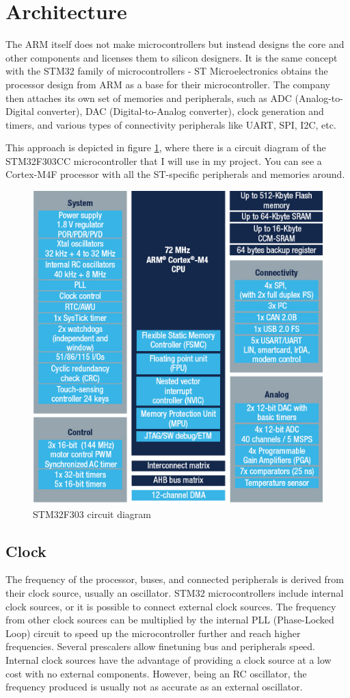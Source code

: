 \section{Architecture}
\label{sec:stm_arch}
The ARM itself does not make microcontrollers but instead designs the core and other components and licenses them to silicon designers. It is the same concept with the STM32 family of microcontrollers - ST Microelectronics obtains the processor design from ARM as a base for their microcontroller. The company then attaches its own set of memories and peripherals, such as ADC (Analog-to-Digital converter), DAC (Digital-to-Analog converter), clock generation and timers, and various types of connectivity peripherals like UART, SPI, I2C, etc.

This approach is depicted in figure \ref{fig:f303}, where there is a circuit diagram of the STM32F303CC microcontroller that I will use in my project.  You can see a Cortex-M4F processor with all the ST-specific peripherals and memories around.
\begin{figure}
\includegraphics[width=0.6\linewidth]{images/en.bd_stm32f303}
\caption{STM32F303 circuit diagram \cite{f303_diagram}} %
\label{fig:f303}
\end{figure}

	\subsection{Clock}
	\label{sub:clock}
The frequency of the processor, buses, and connected peripherals is derived from their clock source, usually an oscillator. STM32 microcontrollers include internal clock sources, or it is possible to connect external clock sources. The frequency from other clock sources can be multiplied by the internal PLL (Phase-Locked Loop) circuit to speed up the microcontroller further and reach higher frequencies. Several prescalers allow finetuning bus and peripherals speed. Internal clock sources have the advantage of providing a clock source at a low cost with no external components. However, being an RC oscillator, the frequency produced is usually not as accurate as an external oscillator.


